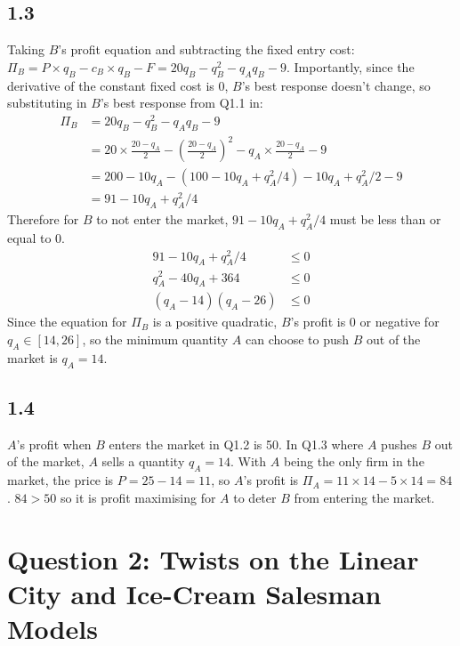 \documentclass{article}
\begin{document}
\subsection*{1.3}
Taking $B$'s profit equation and subtracting the fixed entry cost:
$\Pi_{B} = P \times q_{B} - c_{B} \times q_{B} - F = 20q_{B} - q_{B}^{2} - q_{A}q_{B} - 9.$
Importantly, since the derivative of the constant fixed cost is 0, $B$'s best response doesn't change, so substituting in $B$'s best response from Q1.1 in:
\begin{align*}
    \Pi_{B} &= 20q_{B} - q_{B}^{2} - q_{A}q_{B} - 9\\
    &= 20 \times \frac{20 - q_{A}}{2} - \left( \frac{20 - q_{A}}{2} \right)^{2} - q_{A} \times \frac{20 - q_{A}}{2} - 9\\
    &= 200 - 10q_{A} - (100 - 10q_{A} + q_{A}^{2}/4) - 10q_{A} + q_{A}^{2}/2 - 9\\
    &= 91 - 10q_{A} + q_{A}^{2}/4
\end{align*}
Therefore for $B$ to not enter the market, $91 - 10q_{A} + q_{A}^{2}/4$ must be less than or equal to 0.
\begin{align*}
    91 - 10q_{A} + q_{A}^{2}/4 &\leq 0\\
    q_{A}^{2} - 40q_{A} + 364 &\leq 0\\
    (q_{A} - 14)(q_{A} - 26) &\leq 0
\end{align*}
Since the equation for $\Pi_{B}$ is a positive quadratic, $B$'s profit is 0 or negative for $q_{A} \in [14, 26]$, so the minimum quantity $A$ can choose to push $B$ out of the market is $q_{A} = 14$.

\subsection*{1.4}
$A$'s profit when $B$ enters the market in Q1.2 is 50. In Q1.3 where $A$ pushes $B$ out of the market, $A$ sells a quantity $q_{A} = 14$. With $A$ being the only firm in the market, the price is $P = 25 - 14 = 11$, so $A$'s profit is $\Pi_{A} = 11 \times 14 - 5 \times 14 = 84$. $84 > 50$ so it is profit maximising for $A$ to deter $B$ from entering the market.

\section*{Question 2: Twists on the Linear City and Ice-Cream Salesman Models}
\end{document}
